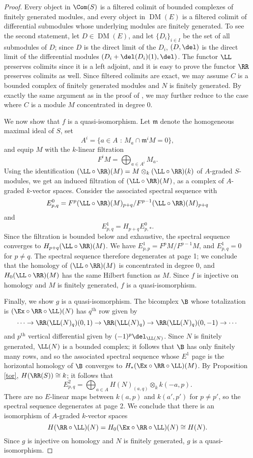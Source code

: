 \documentclass[12pt]{amsart}
\theoremstyle{definition}
\theoremstyle{remark}
\newcommand{\m}{\mathfrak m}
\def\on{\operatorname}
\def\DM{\operatorname{DM}}
\def\th{\on{th}}
\begin{document}
\begin{proof}
Every object in $\Com(S)$ is a filtered colimit of bounded complexes of finitely generated modules, and every object in $\DM(E)$ is a filtered colimit of differential submodules whose underlying modules are finitely generated. To see the second statement, let $D \in \DM(E)$, and let $\{D_i \}_{i \in I}$ be the set of all submodules of $D$; since $D$ is the direct limit of the $D_i$, $(D, \del)$ is the direct limit of the differential modules $(D_i + \del(D_i)(1), \del)$. The functor $\LL$ preserves colimits since it is a left adjoint, and it is easy to prove the functor $\RR$ preserves colimits as well. Since filtered colimits are exact, we may assume $C$ is a bounded complex of finitely generated modules and $N$ is finitely generated. By exactly the same argument as in the proof of \cite[Theorem 2.6]{EFS}, we may further reduce to the case where $C$ is a module $M$ concentrated in degree 0. 

We now show that $f$ is a quasi-isomorphism. Let $\m$ denote the homogeneous maximal ideal of $S$, set
$$
A^i = \{ a \in A \text{ : } M_a \cap \m^i M = 0\},
$$
and equip $M$ with the $k$-linear filtration 
$$
F^i M = \bigoplus_{a \in A^i} M_a.
$$
Using the identification $(\LL \circ \RR)(M) = M \otimes_k (\LL \circ \RR)(k)$ of $A$-graded $S$-modules, we get an induced filtration of $(\LL \circ \RR)(M)$, as a complex of $A$-graded $k$-vector spaces. Consider the associated spectral sequence with
$$
E^0_{p,q} = F^p (\LL \circ \RR)(M)_{p + q} / F^{p-1} (\LL \circ \RR)(M)_{p + q} 
$$
and
$$
E^1_{p,q} = H_{p + q} E^0_{p,*}.
$$
Since the filtration is bounded below and exhaustive, the spectral sequence converges to $H_{p+q}(\LL \circ \RR)(M)$. We have $E^1_{p,p} = F^p M / F^{p-1}M$, and $E^1_{p,q} = 0$ for $p \ne q$. The spectral sequence therefore degenerates at page 1; we conclude that the homology of $(\LL \circ \RR)(M)$ is concentrated in degree 0, and $H_0(\LL \circ \RR)(M)$ has the same Hilbert function as $M$. Since $f$ is injective on homology and $M$ is finitely generated, $f$ is a quasi-isomorphism.

Finally, we show $g$ is a quasi-isomorphism. The bicomplex $\B$ whose totalization is $(\Ex \circ \RR \circ \LL)(N)$ has $q^{\th}$ row given by
$$
\cdots \to \RR( \LL(N)_q ) (0, 1) \to \RR( \LL(N)_q ) \to \RR( \LL(N)_q ) (0, -1) \to \cdots
$$
and $p^{\th}$ vertical differential given by $(-1)^p\del_{\LL(N)}$. Since $N$ is finitely generated, $\LL(N)$ is a bounded complex; it follows that $\B$ has only finitely many rows, and so the associated spectral sequence whose $E^1$ page is the horizontal homology of $\B$ converges to $H_*(\Ex \circ \RR \circ \LL)(M)$. By Proposition \ref{tor}, $H(\RR(S)) \cong k$; it follows that
$$
E^2_{p,q} = \bigoplus_{a \in A} H(N)_{(a, q)} \otimes_k k(-a, p). 
$$
There are no $E$-linear maps between $k(a, p)$ and $k(a', p')$ for $p \ne p'$, so the spectral sequence degenerates at page 2. We conclude that there is an isomorphism of $A$-graded $k$-vector spaces
$$
H(\RR \circ \LL)(N) = H_0(\Ex \circ \RR \circ \LL)(N) \cong H(N).
$$
Since $g$ is injective on homology and $N$ is finitely generated, $g$ is a quasi-isomorphism.
\end{proof}
\end{document}
